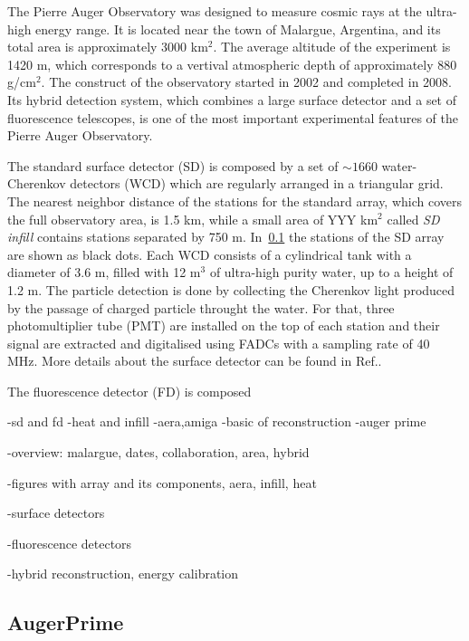The Pierre Auger Observatory was designed to measure
cosmic rays at the ultra-high energy range.
It is located near the town of Malargue, Argentina,
and its total area is approximately 3000 km$^2$.
The average altitude of the experiment is 1420 m, which
corresponds to a vertival atmospheric depth of approximately 880 g/cm$^2$.
The construct of the observatory started in 2002 and completed in 2008.
Its hybrid detection system, which combines a large surface detector 
and a set of fluorescence telescopes, is one of the most important experimental features
of the Pierre Auger Observatory.  


The standard surface detector (SD) is composed by a set of $\sim 1660$
water-Cherenkov detectors (WCD) which are regularly arranged in a triangular grid.
The nearest neighbor distance of the stations for the standard array,
which covers the full observatory area, is 1.5 km, while a small area of YYY km$^2$
called \emph{SD infill} contains stations separated by 750 m.
In~\cref{} the stations of the SD array
are shown as black dots. Each WCD consists of a cylindrical tank with a diameter of 3.6 m,
filled with 12 m$^3$ of ultra-high purity water, up to a height of 1.2 m. The particle
detection is done by collecting the Cherenkov light produced by the passage of charged
particle throught the water. For that, three photomultiplier tube (PMT) are installed
on the top of each station and their signal are extracted and digitalised using FADCs
with a sampling rate of 40 MHz. 
More details about the surface detector can be found in Ref.\cite{}.

The fluorescence detector (FD) is composed 



-sd and fd
-heat and infill
-aera,amiga 
-basic of reconstruction
-auger prime


-overview: malargue, dates, collaboration, area, hybrid 

-figures with array and its components, aera, infill, heat

-surface detectors

-fluorescence detectors

-hybrid reconstruction, energy calibration



\subsection{AugerPrime}






